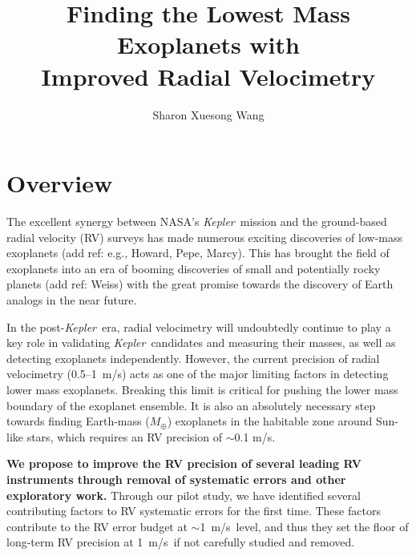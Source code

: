 \documentclass[12pt]{article}
\def\mps{m/s}
\def\mearth{M_{\oplus}}
\def\kepler{{\it Kepler}}
\begin{document}

\title{\vspace{-45pt} \bf \Large Finding the Lowest Mass Exoplanets with
  \\ Improved Radial Velocimetry \vspace{-6pt}}
\author{\normalsize Sharon Xuesong Wang}
\date{}
\maketitle

\vspace{-30pt}
\section{Overview}

The excellent synergy between NASA's \kepler\ mission and the
ground-based radial velocity (RV) surveys has made numerous exciting
discoveries of low-mass exoplanets (add ref: e.g., Howard, Pepe,
Marcy). This has brought the field of exoplanets into an era of
booming discoveries of small and potentially rocky planets (add ref:
Weiss) with the great promise towards the discovery of Earth analogs
in the near future.

In the post-\kepler\ era, radial velocimetry will undoubtedly continue
to play a key role in validating \kepler\ candidates and measuring
their masses, as well as detecting exoplanets independently. However,
the current precision of radial velocimetry (0.5--1~\mps) acts as one
of the major limiting factors in detecting lower mass
exoplanets. Breaking this limit is critical for pushing the lower mass
boundary of the exoplanet ensemble. It is also an absolutely
necessary step towards finding Earth-mass ($\mearth$) exoplanets in
the habitable zone around Sun-like stars, which requires an RV
precision of $\sim$0.1 \mps.

\textbf{We propose to improve the RV precision of several leading RV
  instruments through removal of systematic errors and other
  exploratory work.} Through our pilot study, we have identified
several contributing factors to RV systematic errors for the first
time. These factors contribute to the RV error budget at
$\sim$1~\mps\ level, and thus they set the floor of long-term RV
precision at 1~\mps\ if not carefully studied and removed.
\end{document}
